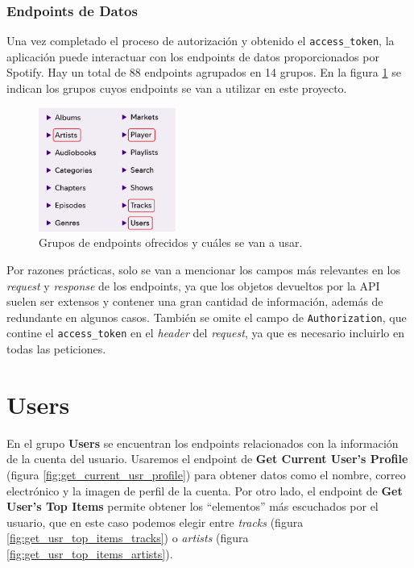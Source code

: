 \subsubsection{Endpoints de Datos}

Una vez completado el proceso de autorización y obtenido el \texttt{access\_token}, la aplicación puede interactuar con los endpoints de datos proporcionados por Spotify. Hay un total de 88 endpoints agrupados en 14 grupos. En la figura \ref{fig:selected_groups} se indican los grupos cuyos endpoints se van a utilizar en este proyecto.

\begin{figure}[H]
    \centering
    \includegraphics[width=0.4\textwidth]{figures/selected_groups.png}
    \caption{Grupos de endpoints ofrecidos y cuáles se van a usar.}
    \label{fig:selected_groups}
\end{figure}

Por razones prácticas, solo se van a mencionar los campos más relevantes en los \textit{request} y \textit{response} de los endpoints, ya que los objetos devueltos por la API suelen ser extensos y contener una gran cantidad de información, además de redundante en algunos casos. También se omite el campo de \texttt{Authorization}, que contine el \texttt{access\_token} en el \textit{header} del \textit{request}, ya que es necesario incluirlo en todas las peticiones.

\section*{Users}

En el grupo \textbf{Users} se encuentran los endpoints relacionados con la información de la cuenta del usuario. Usaremos el endpoint de \textbf{Get Current User's Profile} (figura \ref{fig:get_current_usr_profile}) para obtener datos como el nombre, correo electrónico y la imagen de perfil de la cuenta. Por otro lado, el endpoint de \textbf{Get User's Top Items} permite obtener los ``elementos'' más escuchados por el usuario, que en este caso podemos elegir entre \textit{tracks} (figura \ref{fig:get_usr_top_items_tracks}) o \textit{artists} (figura \ref{fig:get_usr_top_items_artists}).

